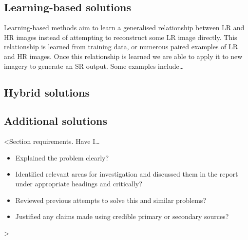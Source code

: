 \subsection{Learning-based solutions}
Learning-based methods aim to learn a generalised relationship between LR and HR images instead of attempting to reconstruct some LR image directly. This relationship is learned from training data, or numerous paired examples of LR and HR images. Once this relationship is learned we are able to apply it to new imagery to generate an SR output. Some examples include\dots

\subsection{Hybrid solutions}

\subsection{Additional solutions}

<Section requirements. Have I\dots
\begin{itemize}
    \item Explained the problem clearly?
    \item Identified relevant areas for investigation and discussed them in the report under appropriate headings and critically?
    \item Reviewed previous attempts to solve this and similar problems?
    \item Justified any claims made using credible primary or secondary sources?
\end{itemize}
>